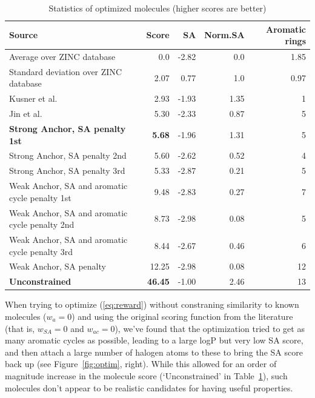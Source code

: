 \documentclass[11pt]{article}
\begin{document}
\begin{table}[ht]
	\begin{center}
		
		\begin{tabular}{|l|r|r|r|r|} 
			\hline
			Source & Score & SA & Norm.SA & Aromatic rings\\
			\hline
			Average over ZINC database&0.0&-2.82& 0.0 &1.85\\
			Standard deviation over ZINC database&2.07&0.77&1.0&0.97\\\hline
			Kusner et al. & 2.93 & -1.93 & 1.35 & 1 \\
			Jin et al. & 5.30 & -2.33 & 0.87 & 5 \\\hline
			{\bf Strong Anchor, SA penalty 1st} &{\bf 5.68} & -1.96 & 1.31 & 5 \\
			Strong Anchor, SA penalty 2nd & 5.60 & -2.62 & 0.52 & 4 \\
			Strong Anchor, SA penalty 3rd & 5.33 & -2.87 & 0.21 & 5 \\\hline
			Weak Anchor, SA and aromatic cycle penalty 1st & 9.48 & -2.83 & 0.27 & 7 \\
			Weak Anchor, SA and aromatic cycle penalty 2nd & 8.73 & -2.98 & 0.08 & 5 \\
			Weak Anchor, SA and aromatic cycle penalty 3rd & 8.44 & -2.67 & 0.46 & 6 \\\hline
			Weak Anchor, SA penalty & 12.25 & -2.98 & 0.08 & 12 \\
			{\bf Unconstrained}& {\bf 46.45} & -1.00 & 2.46 & 13 \\
			\hline
		\end{tabular}
		\caption{Statistics of optimized molecules (higher scores are better)}\label{tab:table1}
	\end{center}
\end{table}
When trying to optimize  (\ref{eq:reward}) without constraning similarity to known molecules ($w_{a} =0$) and using the original scoring function from the literature (that is, $w_{SA}=0$ and  $w_{ac}=0$), we've found that the optimization tried to get as many aromatic cycles as possible, leading to a large logP but very low SA score, and then attach a large number of halogen atoms to these to bring the SA score back up (see Figure~\ref{fig:optim}, right). While this allowed for an order of magnitude increase in the molecule score (`Unconstrained' in Table~\ref{tab:table1}), such molecules don't appear to be realistic candidates for having useful properties. 
\end{document}

